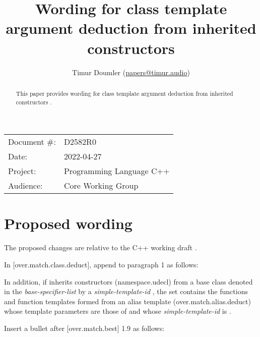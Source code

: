 

\newcommand{\forceindent}{\parindent=1em\indent\parindent=0pt\relax} %



\title{Wording for class template argument deduction from inherited constructors}
\author{
  Timur Doumler \small(\href{mailto:papers@timur.audio}{papers@timur.audio})
}
\date{}
\maketitle

\begin{tabular}{ll}
Document \#: & D2582R0 \\
Date: & 2022-04-27\\
Project: & Programming Language C++ \\
Audience: & Core Working Group
\end{tabular}


\begin{abstract}
This paper provides wording for class template argument deduction from inherited constructors \cite{P1021R5}.
\end{abstract}

\section{Proposed wording}

The proposed changes are relative to the C++ working draft \cite{N4910}. 

In [over.match.class.deduct], append to paragraph 1 as follows:

\begin{adjustwidth}{0.5cm}{0.5cm}
\begin{addedblock}
In addition, if  inherits constructors (namespace.udecl) from a base class denoted in the \emph{base-specifier-list} by a \emph{simple-template-id} , the set contains the functions and function templates formed from an alias template (over.match.alias.deduct) whose template parameters are those of  and whose \emph{simple-template-id} is .
\end{addedblock}
\end{adjustwidth}

Insert a bullet after [over.match.best] 1.9 as follows:

